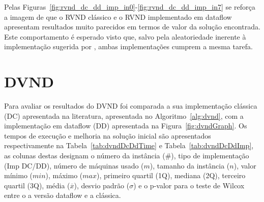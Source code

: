 Pelas Figuras~\ref{fig:rvnd_dc_dd_imp_in0}-\ref{fig:rvnd_dc_dd_imp_in7} se reforça a imagem de que o RVND clássico e o RVND implementado em dataflow apresentam resultados muito parecidos em termos de valor da solução encontrada.
Este comportamento é esperado visto que, salvo pela aleatoriedade inerente à implementação sugerida por \cite{souza2010}, ambas implementações cumprem a mesma tarefa.










\section{DVND} \label{sec:resultadosDVND}

Para avaliar os resultados do DVND foi comparada a sua implementação clássica (DC) apresentada na literatura, apresentada no Algoritmo~\ref{alg:dvnd}, com a implementação em dataflow (DD) apresentada na Figura~\ref{fig:dvndGraph}.
Os tempos de execução e melhoria na solução inicial são apresentados respectivamente na Tabela~\ref{tab:dvndDcDdTime} e Tabela~\ref{tab:dvndDcDdImp}, as colunas destas designam o número da instância (\#), tipo de implementação (Imp DC/DD), número de máquinas usado ($m$), tamanho da instância ($n$), valor mínimo ($min$), máximo ($max$), primeiro quartil (1Q), mediana (2Q), terceiro quartil (3Q), média ($\overline{x}$), desvio padrão ($\sigma$) e o p-valor para o teste de Wilcox entre o a versão dataflow e a clássica.

